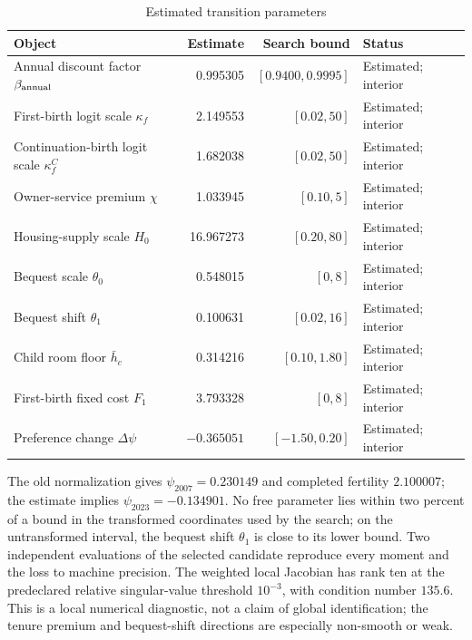 \documentclass[11pt]{article}
\theoremstyle{definition}
\newcommand{\1}{\mathbf 1}
\begin{document}
\begin{table}[ht!]
\centering
\caption{Estimated transition parameters}
\label{tab:transition_parameters}
\scriptsize
\setlength{\tabcolsep}{4pt}
\begin{tabularx}{\textwidth}{@{}>{\raggedright\arraybackslash}Xrr>{\raggedright\arraybackslash}X@{}}
\toprule
Object & Estimate & Search bound & Status \\
\midrule
Annual discount factor \(\beta_{\rm annual}\)
 & 0.995305 & \([0.9400,0.9995]\) & Estimated; interior \\
First-birth logit scale \(\kappa_f\)
 & 2.149553 & \([0.02,50]\) & Estimated; interior \\
Continuation-birth logit scale \(\kappa_f^C\)
 & 1.682038 & \([0.02,50]\) & Estimated; interior \\
Owner-service premium \(\chi\)
 & 1.033945 & \([0.10,5]\) & Estimated; interior \\
Housing-supply scale \(H_0\)
 & 16.967273 & \([0.20,80]\) & Estimated; interior \\
Bequest scale \(\theta_0\)
 & 0.548015 & \([0,8]\) & Estimated; interior \\
Bequest shift \(\theta_1\)
 & 0.100631 & \([0.02,16]\) & Estimated; interior \\
Child room floor \(\bar h_c\)
 & 0.314216 & \([0.10,1.80]\) & Estimated; interior \\
First-birth fixed cost \(F_1\)
 & 3.793328 & \([0,8]\) & Estimated; interior \\
Preference change \(\Delta\psi\)
 & \(-0.365051\) & \([-1.50,0.20]\) & Estimated; interior \\
\bottomrule
\end{tabularx}
\end{table}

The old normalization gives \(\psi_{2007}=0.230149\) and completed fertility
\(2.100007\); the estimate implies \(\psi_{2023}=-0.134901\). No free
parameter lies within two percent of a bound in the transformed coordinates
used by the search; on the untransformed interval, the bequest shift
\(\theta_1\) is close to its lower bound. Two independent evaluations of the
selected candidate reproduce every moment and the loss to machine precision.
The weighted local Jacobian has rank ten at the predeclared relative
singular-value threshold \(10^{-3}\), with condition number \(135.6\). This is
a local numerical diagnostic, not a claim of global identification; the tenure
premium and bequest-shift directions are especially non-smooth or weak.
\end{document}
